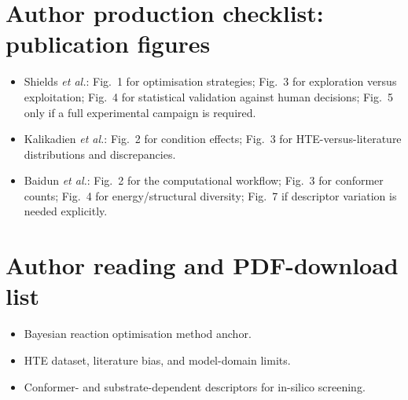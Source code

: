 \section*{Author production checklist: publication figures}

\begin{itemize}
  \item Shields \textit{et al.}: Fig.~1 for optimisation strategies; Fig.~3 for exploration versus exploitation; Fig.~4 for statistical validation against human decisions; Fig.~5 only if a full experimental campaign is required.
  \item Kalikadien \textit{et al.}: Fig.~2 for condition effects; Fig.~3 for HTE-versus-literature distributions and discrepancies.
  \item Baidun \textit{et al.}: Fig.~2 for the computational workflow; Fig.~3 for conformer counts; Fig.~4 for energy/structural diversity; Fig.~7 if descriptor variation is needed explicitly.
\end{itemize}

\section*{Author reading and PDF-download list}

\begin{itemize}
  \item Bayesian reaction optimisation method anchor.
  \item HTE dataset, literature bias, and model-domain limits.
  \item Conformer- and substrate-dependent descriptors for in-silico screening.
\end{itemize}
